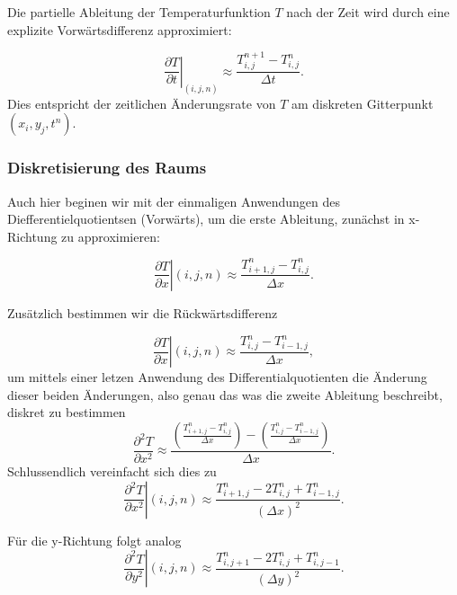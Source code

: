 Die partielle Ableitung der Temperaturfunktion \( T \) nach der Zeit wird durch eine explizite Vorwärtsdifferenz approximiert:

\begin{equation}
	\label{parallelisierung:eq:discrete_time_derivative}
	\left. \frac{\partial T}{\partial t}\right|_{(i,j,n)}
	\approx
	\frac{T_{i,j}^{n+1} - T_{i,j}^n}{\Delta t}.
\end{equation}
Dies entspricht der zeitlichen Änderungsrate von \( T \) am diskreten Gitterpunkt \( (x_i, y_j, t^n) \).

\subsubsection{Diskretisierung des Raums}
Auch hier beginen wir mit der einmaligen Anwendungen des Diefferentielquotientsen (Vorwärts), um die erste Ableitung, zunächst in x-Richtung zu approximieren:

\begin{equation}
	\left. \frac{\partial T}{\partial x} \right|{(i,j,n)}
	\approx \frac{T_{i+1,j}^n - T_{i,j}^n}{\Delta x}.
\end{equation}

Zusätzlich bestimmen wir die Rückwärtsdifferenz

\begin{equation}
	\left. \frac{\partial T}{\partial x} \right|{(i,j,n)}
	\approx \frac{T_{i,j}^n - T_{i-1,j}^n}{\Delta x},
\end{equation}
um mittels einer letzen Anwendung des Differentialquotienten die Änderung dieser beiden Änderungen, also genau das was die zweite Ableitung beschreibt, diskret zu bestimmen
\begin{equation}
	\frac{\partial^2 T}{\partial x^2} \approx
	\frac{ \left( \frac{T_{i+1,j}^n - T_{i,j}^n}{\Delta x} \right) - \left( \frac{T_{i,j}^n - T_{i-1,j}^n}{\Delta x} \right) }{\Delta x}.
\end{equation}
Schlussendlich vereinfacht sich dies zu 
\begin{equation}
	\label{parallelisierung:eq:discrete_x_derivative}
	\left. \frac{\partial^2 T}{\partial x^2} \right|{(i,j,n)} \approx \frac{T_{i+1,j}^n - 2T_{i,j}^n + T_{i-1,j}^n}{(\Delta x)^2}.
\end{equation}

Für die y-Richtung folgt analog
\begin{equation}
	\label{parallelisierung:eq:discrete_y_derivative}
	\left. \frac{\partial^2 T}{\partial y^2} \right|{(i,j,n)} \approx \frac{T_{i,j+1}^n - 2T_{i,j}^n + T_{i,j-1}^n}{(\Delta y)^2}.
\end{equation}


